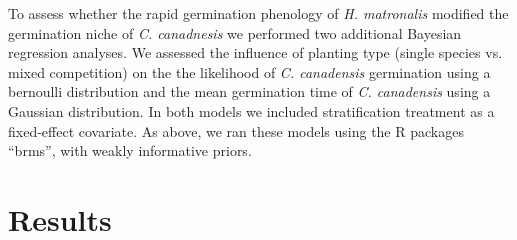 \documentclass{article}\usepackage[]{graphicx}\usepackage[]{color}
\begin{document}
{To assess whether the rapid germination phenology of \textit{H. matronalis} modified the germination niche of \textit{C. canadnesis} we performed two additional Bayesian  regression analyses. We assessed the influence of planting type (single species vs. mixed competition) on the the likelihood of \textit{C. canadensis} germination using a bernoulli distribution and the mean germination time of \textit{C. canadensis} using a Gaussian distribution. In both models we included stratification treatment as a fixed-effect covariate. As above, we ran these models using the R packages ``brms''\citep{Burkner2018},  with weakly informative priors.


\section*{Results}
}
\end{document}
